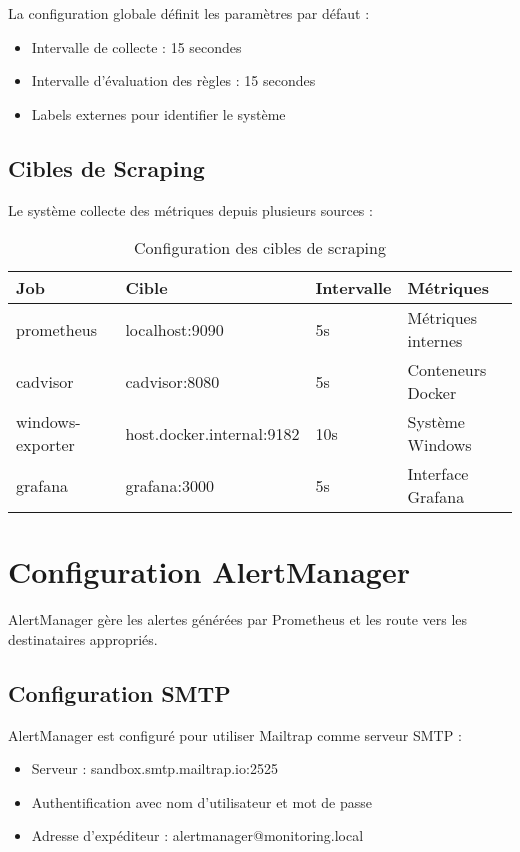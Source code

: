 \documentclass[12pt,a4paper]{report}
\begin{document}
La configuration globale définit les paramètres par défaut :
\begin{itemize}
    \item Intervalle de collecte : 15 secondes
    \item Intervalle d'évaluation des règles : 15 secondes
    \item Labels externes pour identifier le système
\end{itemize}

\subsection{Cibles de Scraping}

Le système collecte des métriques depuis plusieurs sources :

\begin{table}[H]
\centering
\begin{tabular}{|l|l|l|l|}
\hline
\textbf{Job} & \textbf{Cible} & \textbf{Intervalle} & \textbf{Métriques} \\
\hline
prometheus & localhost:9090 & 5s & Métriques internes \\
\hline
cadvisor & cadvisor:8080 & 5s & Conteneurs Docker \\
\hline
windows-exporter & host.docker.internal:9182 & 10s & Système Windows \\
\hline
grafana & grafana:3000 & 5s & Interface Grafana \\
\hline
\end{tabular}
\caption{Configuration des cibles de scraping}
\label{tab:scraping-targets}
\end{table}

\section{Configuration AlertManager}

AlertManager gère les alertes générées par Prometheus et les route vers les destinataires appropriés.

\subsection{Configuration SMTP}

AlertManager est configuré pour utiliser Mailtrap comme serveur SMTP :
\begin{itemize}
    \item Serveur : sandbox.smtp.mailtrap.io:2525
    \item Authentification avec nom d'utilisateur et mot de passe
    \item Adresse d'expéditeur : alertmanager@monitoring.local
\end{itemize}
\end{document}
